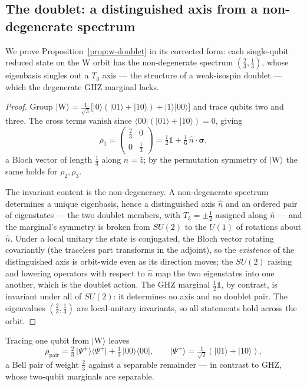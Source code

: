 \subsection{The doublet: a distinguished axis from a non-degenerate spectrum}

We prove Proposition~\ref{prop:w-doublet} in its corrected form: each single-qubit reduced state on
the W orbit has the non-degenerate spectrum $(\tfrac23,\tfrac13)$, whose eigenbasis singles out a
$T_3$ axis --- the structure of a weak-isospin doublet --- which the degenerate GHZ marginal lacks.

\begin{proof}
Group $\lvert\mathrm{W}\rangle = \tfrac1{\sqrt3}\bigl[\lvert0\rangle(\lvert01\rangle+\lvert10\rangle)
+\lvert1\rangle\lvert00\rangle\bigr]$ and trace qubits two and three. The cross terms vanish since
$\langle00\vert(\lvert01\rangle+\lvert10\rangle) = 0$, giving
\begin{equation}
  \rho_1 = \begin{pmatrix}\tfrac23 & 0\\ 0 & \tfrac13\end{pmatrix}
         = \tfrac12\mathbb{1} + \tfrac16\,\hat n\!\cdot\!\boldsymbol{\sigma},
\end{equation}
a Bloch vector of length $\tfrac13$ along $\hat n = \hat z$; by the permutation symmetry of
$\lvert\mathrm{W}\rangle$ the same holds for $\rho_2,\rho_3$.

The invariant content is the non-degeneracy. A non-degenerate spectrum determines a unique
eigenbasis, hence a distinguished axis $\hat n$ and an ordered pair of eigenstates --- the two
doublet members, with $T_3 = \pm\tfrac12$ assigned along $\hat n$ --- and the marginal's symmetry is
broken from $SU(2)$ to the $U(1)$ of rotations about $\hat n$. Under a local unitary the state is
conjugated, the Bloch vector rotating covariantly (the traceless part transforms in the adjoint),
so the \emph{existence} of the distinguished axis is orbit-wide even as its direction moves; the
$SU(2)$ raising and lowering operators with respect to $\hat n$ map the two eigenstates into one
another, which is the doublet action. The GHZ marginal $\tfrac12\mathbb{1}$, by contrast, is
invariant under all of $SU(2)$: it determines no axis and no doublet pair. The eigenvalues
$(\tfrac23,\tfrac13)$ are local-unitary invariants, so all statements hold across the orbit.
\end{proof}

\begin{corollary}\label{app:cor:bell}
Tracing one qubit from $\lvert\mathrm{W}\rangle$ leaves
\begin{equation}
  \rho_{\mathrm{pair}} = \tfrac23\,\lvert\Psi^+\rangle\langle\Psi^+\rvert
  + \tfrac13\,\lvert00\rangle\langle00\rvert,
  \qquad \lvert\Psi^+\rangle = \tfrac1{\sqrt2}(\lvert01\rangle+\lvert10\rangle),
\end{equation}
a Bell pair of weight $\tfrac23$ against a separable remainder --- in contrast to GHZ, whose
two-qubit marginals are separable.
\end{corollary}

